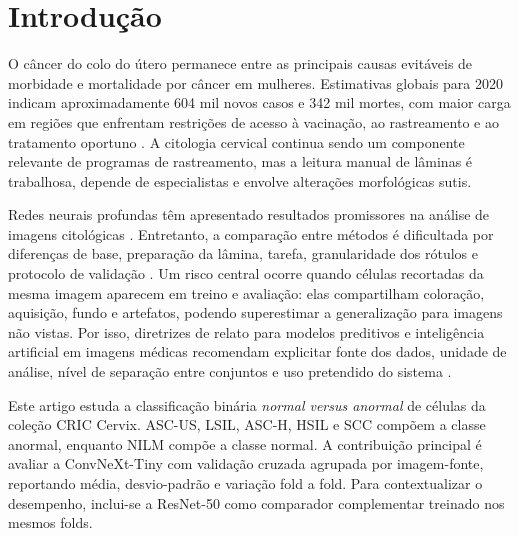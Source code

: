 \section{Introdução}

O câncer do colo do útero permanece entre as principais causas evitáveis de
morbidade e mortalidade por câncer em mulheres. Estimativas globais para 2020
indicam aproximadamente 604 mil novos casos e 342 mil mortes, com maior carga
em regiões que enfrentam restrições de acesso à vacinação, ao rastreamento e ao
tratamento oportuno \cite{singh2023global}. A citologia cervical continua sendo
um componente relevante de programas de rastreamento, mas a leitura manual de
lâminas é trabalhosa, depende de especialistas e envolve alterações
morfológicas sutis.

Redes neurais profundas têm apresentado resultados promissores na análise de
imagens citológicas \cite{jiang2023systematic,fang2024systematic}. Entretanto, a
comparação entre métodos é dificultada por diferenças de base, preparação da
lâmina, tarefa, granularidade dos rótulos e protocolo de validação
\cite{fang2024systematic}. Um risco central ocorre quando células recortadas da
mesma imagem aparecem em treino e avaliação: elas compartilham coloração,
aquisição, fundo e artefatos, podendo superestimar a generalização para imagens
não vistas.
Por isso, diretrizes de relato para modelos preditivos e inteligência
artificial em imagens médicas recomendam explicitar fonte dos dados, unidade de
análise, nível de separação entre conjuntos e uso pretendido do sistema
\cite{collins2024tripod,tejani2024claim}.

Este artigo estuda a classificação binária \emph{normal versus anormal} de
células da coleção CRIC Cervix. ASC-US, LSIL, ASC-H, HSIL e SCC compõem a
classe anormal, enquanto NILM compõe a classe normal. A contribuição principal é
avaliar a ConvNeXt-Tiny \cite{liu2022convnext} com validação cruzada agrupada
por imagem-fonte, reportando média, desvio-padrão e variação fold a fold. Para
contextualizar o desempenho, inclui-se a ResNet-50 \cite{he2016resnet} como
comparador complementar treinado nos mesmos folds.
